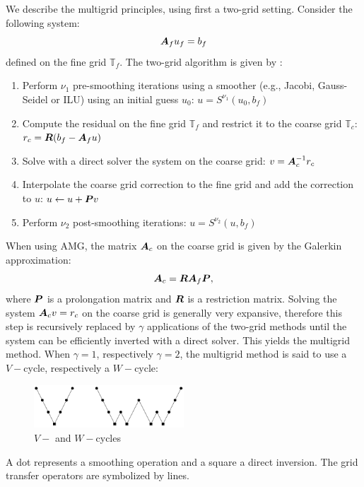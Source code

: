 We describe the multigrid principles, using first a two-grid setting. Consider
the following system:
\begin{equation}
  \boldsymbol{A}_f u_f = b_f
\end{equation}
defined on the fine grid $\mathbb{T}_f$.  The two-grid algorithm is given by :
\begin{enumerate}
  \item Perform $\nu_1$ pre-smoothing iterations using a smoother (e.g., Jacobi,
    Gauss-Seidel or ILU) using an initial guess $u_0$: $u = S^{\nu_1}(u_0,b_f)$
  \item Compute the residual on the fine grid $\mathbb{T}_f$ and restrict it to
    the coarse grid $\mathbb{T}_c$: $r_c = \boldsymbol{R}(b_f-\boldsymbol{A}_f u)$
  \item Solve with a direct solver the system on the coarse grid: 
    $v=\boldsymbol{A}_c^{-1} r_c$
  \item Interpolate the coarse grid correction to the fine grid and add the
    correction to $u$: $u \leftarrow u+\boldsymbol{P}v$
  \item Perform $\nu_2$ post-smoothing iterations: $u = S^{\nu_2}(u,b_f)$
\end{enumerate}
When using AMG, the matrix $\boldsymbol{A}_c$ on the coarse grid is given by the Galerkin
approximation:
\begin{equation}
  \boldsymbol{A}_c = \boldsymbol{R}\boldsymbol{A}_f \boldsymbol{P},
\end{equation}
where $\boldsymbol{P}$ is a prolongation matrix and $\boldsymbol{R}$ is a restriction matrix.
Solving the system $\boldsymbol{A}_c v = r_c$ on the coarse grid is generally very
expansive, therefore this step is recursively replaced by $\gamma$
applications of the  two-grid
methods until the system can be efficiently inverted with a direct solver.
This yields the multigrid method. When $\gamma = 1$, respectively $\gamma =
2$, the multigrid method is said to use a $V-$cycle, respectively a $W-$cycle:
\begin{figure}[H]
  \centering
  \includegraphics[width=0.5\textwidth]{./Dsa/v_w_cycles}
  \caption{$V-$ and $W-$cycles}
\end{figure}
A dot represents a smoothing operation and a square a direct inversion. The grid 
transfer operators are symbolized by lines.

